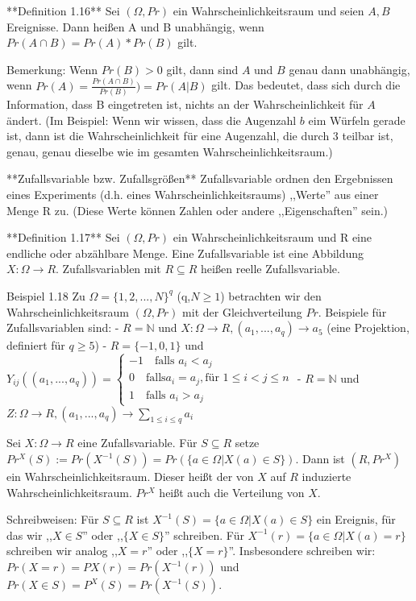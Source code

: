 \documentclass[a4paper]{article}
\begin{document}
\begin{multicols}{3}
**Definition 1.16** Sei $(\Omega,Pr)$ ein Wahrscheinlichkeitsraum und seien $A,B$ Ereignisse. Dann heißen A und B unabhängig, wenn $Pr(A\cap B)=Pr(A)*Pr(B)$ gilt.

Bemerkung: Wenn $Pr(B)> 0$ gilt, dann sind $A$ und $B$ genau dann unabhängig, wenn $Pr(A) = \frac{Pr(A\cap B)}{Pr(B)})= Pr(A|B)$ gilt. Das bedeutet, dass sich durch die Information, dass B eingetreten ist, nichts an der Wahrscheinlichkeit für $A$ ändert. (Im Beispiel: Wenn wir wissen, dass die Augenzahl $b$  eim Würfeln gerade ist, dann ist die Wahrscheinlichkeit für eine Augenzahl, die durch 3 teilbar ist, genau, genau dieselbe wie im gesamten Wahrscheinlichkeitsraum.)

**Zufallsvariable bzw. Zufallsgrößen** Zufallsvariable ordnen den Ergebnissen eines Experiments (d.h. eines Wahrscheinlichkeitsraums) ,,Werte''  aus einer Menge R zu. (Diese Werte können Zahlen oder andere ,,Eigenschaften'' sein.)

**Definition 1.17** Sei $(\Omega,Pr)$ ein Wahrscheinlichkeitsraum und R eine endliche oder abzählbare Menge. Eine Zufallsvariable ist eine Abbildung $X:\Omega\rightarrow R$.
Zufallsvariablen mit $R\subseteq R$ heißen reelle Zufallsvariable.

Beispiel 1.18 Zu $\Omega=\{1,2,...,N\}^q$ (q,$N\geq 1$) betrachten wir den Wahrscheinlichkeitsraum $(\Omega,Pr)$ mit der Gleichverteilung $Pr$. Beispiele für Zufallsvariablen sind:
- $R=\mathbb{N}$ und $X:\Omega\rightarrow R,(a_1,...,a_q)\rightarrow a_5$ (eine Projektion, definiert für $q\geq 5$)
- $R=\{-1,0,1\}$ und $Y_{ij}((a_1,...,a_q))=\begin{cases} -1\quad\text{falls } a_i< a_j\\ 0\quad\text{falls} a_i=a_j, \text{für } 1\leq i < j\leq n \\ 1\quad\text{falls } a_i> a_j\end{cases}$
- $R=\mathbb{N}$ und $Z:\Omega\rightarrow R,(a_1 ,...,a_q)\rightarrow\sum_{1\leq i\leq q} a_i$

Sei $X:\Omega\rightarrow R$ eine Zufallsvariable. Für $S\subseteq R$ setze $Pr^X(S):= Pr(X^{-1}(S))=Pr(\{a\in\Omega|X(a)\in S\})$. Dann ist $(R,Pr^X)$ ein Wahrscheinlichkeitsraum. Dieser heißt der von $X$ auf $R$ induzierte Wahrscheinlichkeitsraum. $Pr^X$ heißt auch die Verteilung von $X$.

Schreibweisen: Für $S\subseteq R$ ist $X^{-1}(S)=\{a\in\Omega|X(a)\in S\}$ ein Ereignis, für das wir ,,$X\in S$'' oder ,,$\{X\in S\}$'' schreiben. Für $X^{-1}(r)=\{a\in\Omega|X(a) =r\}$ schreiben wir analog ,,$X=r$'' oder ,,$\{X=r\}$''. Insbesondere schreiben wir: $Pr(X=r)=PX(r)=Pr(X^{-1}(r))$ und $Pr(X\in S)=P^X(S)=Pr(X^{-1}(S))$.


\end{multicols}
\end{document}
